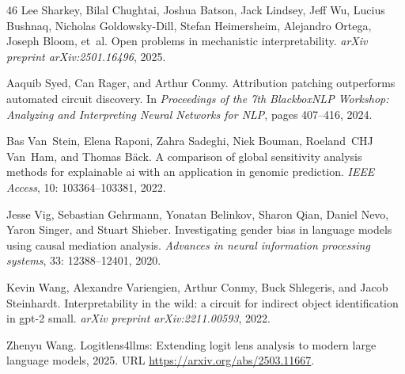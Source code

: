 \begin{thebibliography}{46}
Lee Sharkey, Bilal Chughtai, Joshua Batson, Jack Lindsey, Jeff Wu, Lucius Bushnaq, Nicholas Goldowsky-Dill, Stefan Heimersheim, Alejandro Ortega, Joseph Bloom, et~al.
\newblock Open problems in mechanistic interpretability.
\newblock \emph{arXiv preprint arXiv:2501.16496}, 2025.

Aaquib Syed, Can Rager, and Arthur Conmy.
\newblock Attribution patching outperforms automated circuit discovery.
\newblock In \emph{Proceedings of the 7th BlackboxNLP Workshop: Analyzing and Interpreting Neural Networks for NLP}, pages 407--416, 2024.

Bas Van~Stein, Elena Raponi, Zahra Sadeghi, Niek Bouman, Roeland~CHJ Van~Ham, and Thomas B{\"a}ck.
\newblock A comparison of global sensitivity analysis methods for explainable ai with an application in genomic prediction.
\newblock \emph{IEEE Access}, 10: 103364--103381, 2022.

Jesse Vig, Sebastian Gehrmann, Yonatan Belinkov, Sharon Qian, Daniel Nevo, Yaron Singer, and Stuart Shieber.
\newblock Investigating gender bias in language models using causal mediation analysis.
\newblock \emph{Advances in neural information processing systems}, 33: 12388--12401, 2020.

Kevin Wang, Alexandre Variengien, Arthur Conmy, Buck Shlegeris, and Jacob Steinhardt.
\newblock Interpretability in the wild: a circuit for indirect object identification in gpt-2 small.
\newblock \emph{arXiv preprint arXiv:2211.00593}, 2022.

Zhenyu Wang.
\newblock Logitlens4llms: Extending logit lens analysis to modern large language models, 2025.
\newblock URL \url{https://arxiv.org/abs/2503.11667}.

\end{thebibliography}
